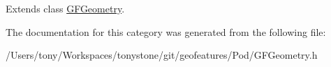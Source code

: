 Extends class \hyperlink{interface_g_f_geometry_a69a56e7786e1de09034c546ade1c7262}{G\+F\+Geometry}.



The documentation for this category was generated from the following file\+:\begin{DoxyCompactItemize}
\item 
/\+Users/tony/\+Workspaces/tonystone/git/geofeatures/\+Pod/G\+F\+Geometry.\+h\end{DoxyCompactItemize}
